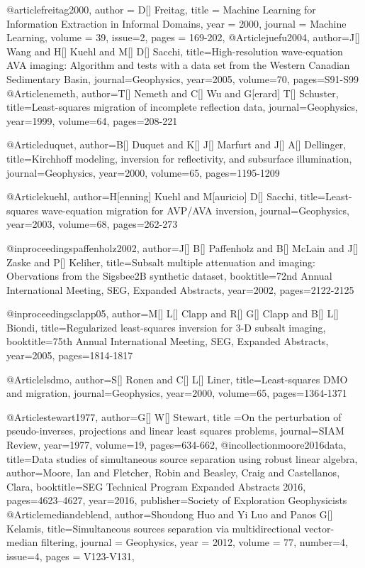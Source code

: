 @article{freitag2000,
author = {D[] Freitag},
title = {Machine Learning for Information Extraction in Informal Domains},
year = {2000},
journal = {Machine Learning},
volume = {39},
issue=2,
pages = {169-202},
}
@Article{juefu2004,
	author={J[] Wang and H[] Kuehl and M[] D[] Sacchi},
	title={High-resolution wave-equation {AVA} imaging: {A}lgorithm and tests with a data set from the {W}estern {C}anadian {S}edimentary {B}asin},
	journal={Geophysics},
	year=2005,
	volume=70,
	pages={S91-S99}
}
@Article{nemeth,
	author={T[] Nemeth and C[] Wu and G[erard] T[] Schuster},
	title={Least-squares migration of incomplete reflection data},
	journal={Geophysics},
	year=1999,
	volume=64,
	pages={208-221}
}

@Article{duquet,
	author={B[] Duquet and K[] J[] Marfurt and J[] A[] Dellinger},
	title={Kirchhoff modeling, inversion for reflectivity, and subsurface illumination},
	journal={Geophysics},
	year=2000,
	volume=65,
	pages={1195-1209}
}

@Article{kuehl,
	author={H[enning] Kuehl and M[auricio] D[] Sacchi},
	title={Least-squares wave-equation migration for {AVP/AVA} inversion},
	journal={Geophysics},
	year=2003,
	volume=68,
	pages={262-273}
}

@inproceedings{paffenholz2002,
	author={J[] B[] Paffenholz and B[] McLain and J[] Zaske and P[] Keliher},
	title={Subsalt multiple attenuation and imaging: Obervations from the {Sigsbee2B} synthetic dataset},
	booktitle={72nd Annual International Meeting, SEG, Expanded Abstracts},
	year=2002,
	pages={2122-2125}
}

@inproceedings{clapp05,
	author={M[] L[] Clapp and R[] G[] Clapp and B[] L[] Biondi},
    title={Regularized least-squares inversion for 3-{D} subsalt imaging},
	booktitle={75th Annual International Meeting, SEG, Expanded Abstracts},
	year=2005,
	pages={1814-1817}
}

@Article{lsdmo,
	author={S[] Ronen and C[] L[] Liner},
	title={Least-squares {DMO} and migration},
	journal={Geophysics},
	year=2000,
	volume=65,
	pages={1364-1371}
}

@Article{stewart1977,
  author={G[] W[] Stewart},
  title ={On the perturbation of pseudo-inverses, projections and linear least squares problems},
  journal={SIAM Review},
  year=1977,
  volume=19,
  pages={634-662},
}
@incollection{moore2016data,
  title={Data studies of simultaneous source separation using robust linear algebra},
  author={Moore, Ian and Fletcher, Robin and Beasley, Craig and Castellanos, Clara},
  booktitle={SEG Technical Program Expanded Abstracts 2016},
  pages={4623--4627},
  year={2016},
  publisher={Society of Exploration Geophysicists}
}
@Article{mediandeblend,
  author={Shoudong Huo and Yi Luo and Panos G[] Kelamis},
  title={Simultaneous sources separation via multidirectional vector-median filtering},
  journal = 	 {Geophysics},
  year = 	 2012,
  volume =	 77,
  number=4,
  issue=4,
  pages =	 {V123-V131},
}

